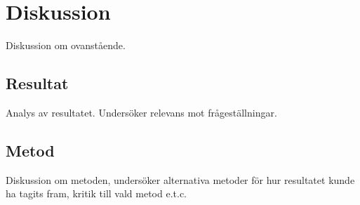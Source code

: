 \section{Diskussion}
\label{sec:axel-discussion}

Diskussion om ovanstående.

\subsection{Resultat}
\label{subsec:axel-discussion-results}

Analys av resultatet. Undersöker relevans mot frågeställningar.

\subsection{Metod}
\label{subsec:axel-discussion-method}

Diskussion om metoden, undersöker alternativa metoder för hur resultatet kunde ha tagits fram, kritik till vald metod e.t.c.
